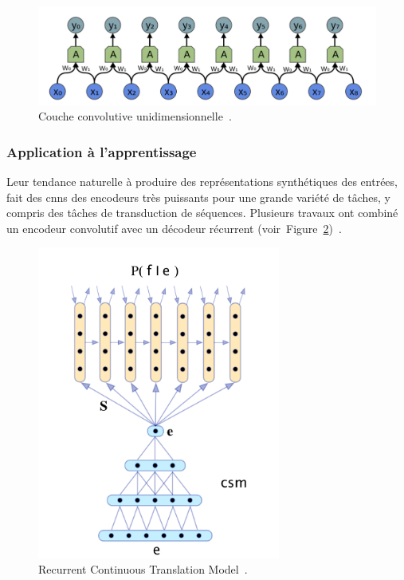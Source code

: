 \begin{figure}[hbt]
    \begin{center}
        \includegraphics[width=\textwidth]{assets/images/conv1d.png}
    \end{center}    
    \caption[Couche convolutive unidimensionnelle.]%
    {Couche convolutive unidimensionnelle~\cite{Understanding_Convolutions}.}
    \label{fig.layer-conv1d}
\end{figure}


\subsubsection{Application à l'apprentissage }

Leur tendance naturelle à produire des représentations synthétiques des entrées,
fait des \glspl{cnn} des encodeurs très puissants pour une grande variété de tâches,
y compris des tâches de transduction de séquences.
Plusieurs travaux ont combiné un encodeur convolutif avec un décodeur récurrent%
(voir~Figure~\ref{fig.rctm})~\cite{deep-nmt-survey}.

\begin{figure}[hbt]
    \centering
    \includegraphics[width=8cm]{assets/images/ctrm.png}
    \caption[Recurrent Continuous Translation Model.]%
    {Recurrent Continuous Translation Model~\cite{Kalchbrenner_Blunsom_2013}.}
    \label{fig.rctm}
\end{figure}

